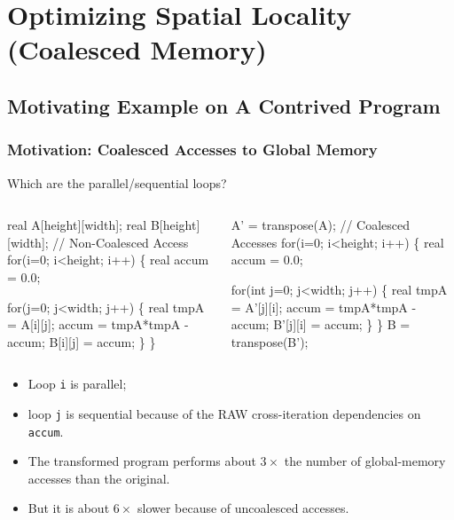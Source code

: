 \documentclass{beamer}
\renewcommand{\emph}[1]{\textcolor{CosGreen}{ #1}}
\newcommand{\emp}[1]{\textcolor{DikuRed}{ #1}}
\begin{document}

\section{Optimizing Spatial Locality (Coalesced Memory)}

\begin{frame}[fragile]
	\tableofcontents[currentsection]
\end{frame}

\subsection{Motivating Example on A Contrived Program}

\begin{frame}[fragile,t]
  \frametitle{Motivation: Coalesced Accesses to Global Memory} 

Which are the parallel/sequential loops?

\begin{columns}
\begin{colorcode}[fontsize=\scriptsize]
real A[height][width];
real B[height][width];
// Non-Coalesced Access
\emph{for(i=0; i<height; i++) \{}
  real accum  = 0.0;

  \emp{for(j=0; j<width; j++) \{}
    real tmpA = A[i][j];
    accum = tmpA*tmpA - accum;
    B[i][j] = accum;
  \}
\}\pause
\end{colorcode}
\begin{colorcode}[fontsize=\scriptsize]
A' = transpose(A);
// Coalesced Accesses
\emph{for(i=0; i<height; i++) \{}
  real accum = 0.0;

  \emp{for(int j=0; j<width; j++) \{}
    real tmpA = A'[j][i];
    accum = tmpA*tmpA - accum;
    B'[j][i] = accum;
  \}
\}
B = transpose(B');
\end{colorcode}
\end{columns}
\bigskip

\begin{itemize}
    \item \emph{Loop {\tt i} is parallel;}\smallskip
    \item \emp{loop {\tt j} is sequential} because 
            of the RAW cross-iteration dependencies on {\tt accum}.\bigskip
    \item The transformed program performs about $3\times$ the number
            of global-memory accesses than the original. \pause\smallskip
    \item But it is about $6\times$ slower because of uncoalesced accesses.
\end{itemize}

\end{frame}
\end{document}
